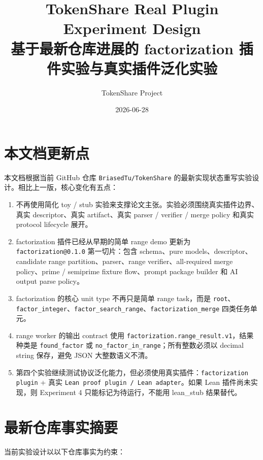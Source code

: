 \documentclass[11pt]{ctexart}
\title{TokenShare Real Plugin Experiment Design\\
\large 基于最新仓库进展的 factorization 插件实验与真实插件泛化实验}
\author{TokenShare Project}
\date{2026-06-28}
\begin{document}
\maketitle

\section{本文档更新点}

本文档根据当前 GitHub 仓库 \texttt{BriasedTu/TokenShare} 的最新实现状态重写实验设计。相比上一版，核心变化有五点：

\begin{enumerate}[leftmargin=2em]
  \item 不再使用简化 toy / stub 实验来支撑论文主张。实验必须围绕真实插件边界、真实 descriptor、真实 artifact、真实 parser / verifier / merge policy 和真实 protocol lifecycle 展开。
  \item factorization 插件已经从早期的简单 range demo 更新为 \texttt{factorization@0.1.0} 第一切片：包含 schema、pure models、descriptor、candidate range partition、parser、range verifier、all-required merge policy、prime / semiprime fixture flow、prompt package builder 和 AI output parse policy。
  \item factorization 的核心 unit type 不再只是简单 range task，而是 \texttt{root}、\texttt{factor\_integer}、\texttt{factor\_search\_range}、\texttt{factorization\_merge} 四类任务单元。
  \item range worker 的输出 contract 使用 \texttt{factorization.range\_result.v1}，结果种类是 \texttt{found\_factor} 或 \texttt{no\_factor\_in\_range}；所有整数必须以 decimal string 保存，避免 JSON 大整数语义不清。
  \item 第四个实验继续测试协议泛化能力，但必须使用真实插件：\texttt{factorization plugin} + 真实 \texttt{Lean proof plugin / Lean adapter}。如果 Lean 插件尚未实现，则 Experiment 4 只能标记为待运行，不能用 lean\_stub 结果替代。
\end{enumerate}

\section{最新仓库事实摘要}

当前实验设计以以下仓库事实为约束：
\end{document}
